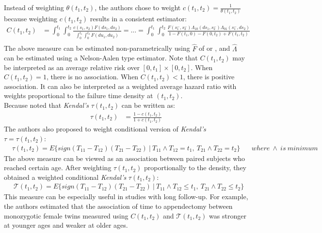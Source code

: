 \documentclass[]{article}
\begin{document}
Instead of weighting $\theta(t_1, t_2)$, the authors chose to weight $c(t_1, t_2) = \frac{1}{\theta(t_1, t_2)}$ because weighting $c(t_1, t_2)$ results in a consistent estimator:
	$$
	\begin{aligned}
		C(t_1, t_2) &= \int_0^{t_1}\int_0^{t_2} \frac{c(s_1, s_2)F(ds_1,ds_2)}{\int_0^{t_1}\int_0^{t_2} F(du_1, du_2)} = ...= \int_0^{t_1}\int_0^{t_2} \frac{F(s_1^-, s_2^-)\Lambda_{10}(ds_1, s^-_2)\Lambda_{01}(s^-_1, ds_2)}{1 - F(t_1, 0) - F(0, t_2)+ F(t_1, t_2)} \\
	\end{aligned}
	$$
	The above measure can be estimated non-parametrically using $\hat{F}$ of \cite{dabrowska1988kaplan} or \cite{prentice1992covariance}, and $\hat{\Lambda}$ can be estimated using a Nelson-Aalen type estimator.
Note that $C(t_1, t_2)$ may be interpreted as an average relative risk over $[0,t_1] \times [0, t_2]$. When $C(t_1, t_2)=1$, there is no association. When $C(t_1, t_2)<1$, there is positive association. It can also be interpreted as a weighted average hazard ratio with weights proportional to the failure time density at $(t_1,t_2)$.\\
Because \cite{oakes1989bivariate} noted that \emph{Kendal's} $\tau(t_1, t_2)$ can be written as:
	$$
	\begin{aligned}
		\tau(t_1, t_2) &= \frac{1 - c(t_1, t_2)}{1+c(t_1, t_2)}
	\end{aligned}
	$$
	The authors also proposed to weight conditional version of \emph{Kendal's} $\tau=\tau(t_1, t_2)$:
	$$
	\begin{aligned}
		&\tau(t_1, t_2) = E\{sign(T_{11} - T_{12}) (T_{21} - T_{22})~|~ T_{11}\wedge T_{12} = t_1,~T_{21}\wedge T_{22} = t_2  \}
		&~~~~where~\wedge~is~minimum
	\end{aligned}
	$$
The above measure can be viewed as an association between paired subjects who reached certain age. After weighting $\tau(t_1, t_2)$ proportionally to the density, they obtained a weighted conditional \emph{Kendal's} $\tau(t_1, t_2)$:
	$$
	\begin{aligned}
		&\mathcal{T}(t_1, t_2) = E\{sign(T_{11} - T_{12}) (T_{21} - T_{22})~|~ T_{11}\wedge T_{12} \leq t_1,~T_{21}\wedge T_{22} \leq t_2  \}
	\end{aligned}
	$$
This measure can be especially useful in studies with long follow-up. For example, the authors estimated that the association of time to appendectomy between monozygotic female twins measured using $C(t_1, t_2)$ and $\mathcal{T}(t_1, t_2)$ was stronger at younger ages and weaker at older ages.\\
\end{document}
